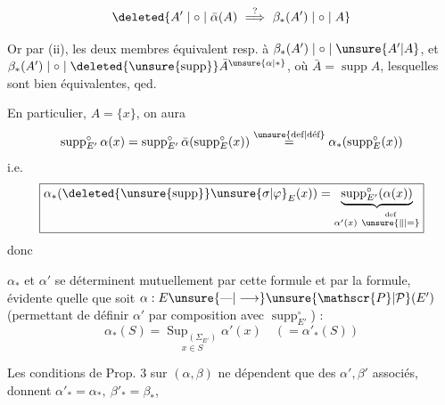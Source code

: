 
\[
\deleted{A'\mid\circ\mid\bar\alpha(A)\ \overset{?}{\Longrightarrow}\ \beta_*(A')\mid\circ\mid A}
\]

Or par (ii), les deux membres équivalent resp. à $\beta_*(A')\mid\circ\mid\unsure{A'|A}$, et $\beta_*(A')\mid\circ\mid\deleted{\unsure{\operatorname{supp}}}\bar A^{\unsure{\alpha|*}}$, où $\bar A=\operatorname{supp}A$, lesquelles sont bien équivalentes, qed.

En particulier,  $A=\{x\}$, on aura
\[
\operatorname{supp}^{\circ}_{E'}\alpha(x)=\operatorname{supp}^{\circ}_{E'}\bar\alpha(\operatorname{supp}^{\circ}_E(x))\overset{\text{\unsure{def|déf}}}=\alpha_*(\operatorname{supp}^{\circ}_E(x))
\]
i.e.
\[
\boxed{\alpha_*(\deleted{\unsure{\operatorname{supp}}}\unsure{\sigma|\varphi}_E(x))=\underbrace{\operatorname{supp}^{\circ}_{E'}(\alpha(x))}_{\alpha'(x)\ \overset{\text{def}}{\unsure{\Vert|=}}}}
\]
donc 

$\alpha_*$ et $\alpha'$ se déterminent mutuellement par cette formule et par la formule, évidente quelle que soit $\alpha:E\unsure{\text{---}|\longrightarrow}\unsure{\mathscr{P}|\mathcal{P}}(E')$ (permettant \inserted{$\unsure{\alpha_*|\alpha}$} de définir $\alpha'$ par composition avec $\operatorname{supp}^{\circ}_{E'}$) :
\[
\boxed{\alpha_*(S)=\underset{x\in S}{\operatorname{Sup}_{(\Sigma_{E'})}}\alpha'(x)}\quad(=\alpha'_*(S))
\]

Les conditions de Prop. 3 sur $(\alpha,\beta)$ ne dépendent que des $\alpha',\beta'$ associés,   donnent $\alpha'_* =\alpha_*,\ \beta'_* =\beta_*$,
